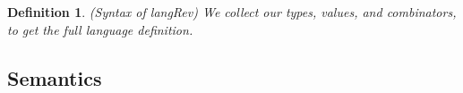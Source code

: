 \documentclass[preprint]{sigplanconf}
\newtheorem{definition}[theorem]{Definition}
\begin{document}
%
%
%

\begin{definition}{(Syntax of {{langRev}})}
\label{def:langRev}
We collect our types, values, and combinators, to get the full language
definition.
%
\end{definition}

\subsection{Semantics}

%

\begin{scriptsize}
\end{scriptsize}

\end{document}
